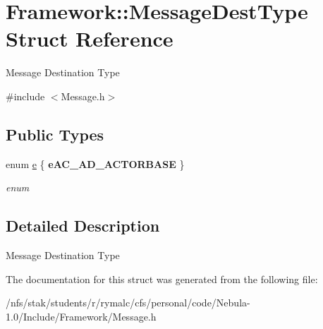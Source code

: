 \hypertarget{structFramework_1_1MessageDestType}{
\section{Framework::MessageDestType Struct Reference}
\label{structFramework_1_1MessageDestType}
}


Message Destination Type  


{\ttfamily \#include $<$Message.h$>$}\subsection*{Public Types}
\begin{DoxyCompactItemize}
\item 
enum \hyperlink{structFramework_1_1MessageDestType_a01bad83165ebb90a486c74856bc255a3}{e} \{ {\bfseries eAC\_\-AD\_\-ACTORBASE}
 \}
\begin{DoxyCompactList}\small\item\em enum \item\end{DoxyCompactList}\end{DoxyCompactItemize}


\subsection{Detailed Description}
Message Destination Type 

The documentation for this struct was generated from the following file:\begin{DoxyCompactItemize}
\item 
/nfs/stak/students/r/rymalc/cfs/personal/code/Nebula-\/1.0/Include/Framework/Message.h\end{DoxyCompactItemize}
